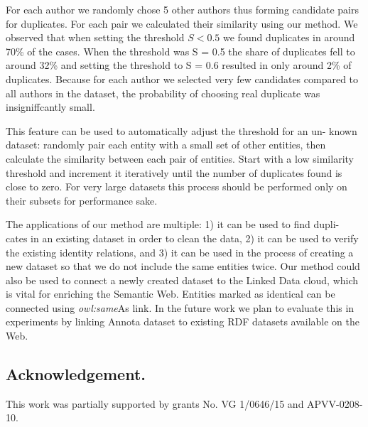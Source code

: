 \documentclass{llncs}
\begin{document}
For each author we randomly chose 5 other authors thus forming candidate 
pairs for duplicates. For each pair we calculated their similarity using our
method. We observed that when setting the threshold $S < 0.5$ we found duplicates 
in around 70\% of the cases. When the threshold was S = 0.5 the share
of duplicates fell to around 32\% and setting the threshold to S = 0.6 resulted
in only around 2\% of duplicates. Because for each author we selected very few
candidates compared to all authors in the dataset, the probability of choosing
real duplicate was insigniffcantly small.

This feature can be used to automatically adjust the threshold for an un-
known dataset: randomly pair each entity with a small set of other entities, then
calculate the similarity between each pair of entities. Start with a low similarity
threshold and increment it iteratively until the number of duplicates found is
close to zero. For very large datasets this process should be performed only on
their subsets for performance sake.

The applications of our method are multiple: 1) it can be used to find dupli-
cates in an existing dataset in order to clean the data, 2) it can be used to verify
the existing identity relations, and 3) it can be used in the process of creating a
new dataset so that we do not include the same entities twice.
Our method could also be used to connect a newly created dataset to the
Linked Data cloud, which is vital for enriching the Semantic Web. Entities
marked as identical can be connected using \textit{owl:same}As link. In the future work
we plan to evaluate this in experiments by linking Annota dataset to existing
RDF datasets available on the Web.

\subsection*{Acknowledgement.}
This work was partially supported by grants No. VG
1/0646/15 and APVV-0208-10.




\end{document}
